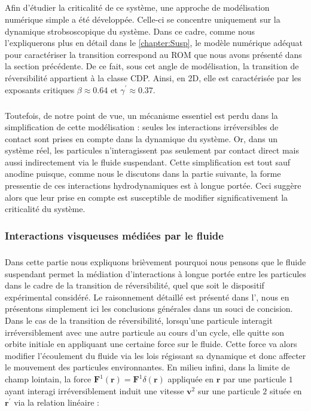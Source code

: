 \subparagraph{}Afin d'étudier la criticalité de ce système, une approche de modélisation numérique simple a été développée. Celle-ci se concentre uniquement sur la dynamique strobsoscopique du système. Dans ce cadre, comme nous l'expliquerons plus en détail dans le \autoref{chapter:Susp}, le modèle numérique adéquat pour caractériser la transition correspond au ROM que nous avons présenté dans la section précédente. De ce fait, sous cet angle de modélisation, la transition de réversibilité appartient à la classe CDP. Ainsi, en 2D, elle est caractérisée par les exposants critiques $\beta \approx 0.64$ et $\gamma^\prime \approx 0.37$.

\subparagraph{}Toutefois, de notre point de vue, un mécanisme essentiel est perdu dans la simplification de cette modélisation : seules les interactions irréversibles de contact sont prises en compte dans la dynamique du système. Or, dans un système réel, les particules n'interagissent pas seulement par contact direct mais aussi indirectement via le fluide suspendant. Cette simplification est tout sauf anodine puisque, comme nous le discutons dans la partie suivante, la forme pressentie de ces interactions hydrodynamiques est à longue portée. Ceci suggère alors que leur prise en compte est susceptible de modifier significativement la criticalité du système.

\subsubsection{Interactions visqueuses médiées par le fluide}

\label{sec:ref_interac_visc}

\subparagraph{}Dans cette partie nous expliquons brièvement pourquoi nous pensons que le fluide suspendant permet la médiation d'interactions à longue portée entre les particules dans le cadre de la transition de réversibilité, quel que soit le dispositif expérimental considéré. Le raisonnement détaillé est présenté dans l', nous en présentons simplement ici les conclusions générales dans un souci de concision. Dans le cas de la transition de réversibilité, lorsqu'une particule interagit irréversiblement avec une autre particule au cours d'un cycle, elle quitte son orbite initiale en appliquant une certaine force sur le fluide. Cette force va alors modifier l'écoulement du fluide via les lois régissant sa dynamique et donc affecter le mouvement des particules environnantes. En milieu infini, dans la limite de champ lointain, la force $\mathbf{F}^1(\mathbf{r})=\mathbf{F}^1\delta(\mathbf{r})$ appliquée en $\mathbf{r}$ par une particule $1$ ayant interagi irréversiblement induit une vitesse $\mathbf{v}^2$ sur une particule $2$ située en $\mathbf{r}^\prime$ via la relation linéaire :

